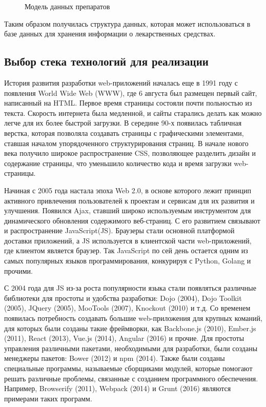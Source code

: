 \begin{figure}

\caption{Модель данных препаратов}
\label{src:src1}
\end{figure}

Таким образом получилась структура данных, которая может использоваться в базе данных для хранения информации о лекарственных средствах.

\subsection{Выбор стека технологий для реализации }

История развития разработки web-приложений началась еще в 1991 году с появления World Wide Web (WWW), где 6 августа был размещен первый сайт, написанный на HTML. Первое время страницы состояли почти польностью из текста. Скорость интернета была медленной, и сайты старались делать как можно легче для их более быстрой загрузки. В середине 90-х появилась табличная верстка, которая позволяла создавать страницы с графическими элементами, ставшая началом упорядоченного структурирования страниц. В начале нового века получило широкое распространение CSS, позволяющее разделить дизайн и содержание страницы, что уменьшило количество кода и время загрузки web-страницы.

Начиная с 2005 года настала эпоха Web 2.0, в основе которого лежит принцип активного привлечения пользователей к проектам и сервисам для их развития и улучшения. Появился Ajax, ставший широко используемым инструментом для динамического обновления содержимого веб-страниц. С его развитием связывают и распространение JavaScript(JS). Браузеры стали основной платформой доставки приложений, а JS используется в клиентской части web-приложений, где клиентом является браузер. Так JavaScript по сей день остается одним из самых популярных языков программирования, конкурируя с Python, Golang и прочими.

С 2004 года для JS из-за роста популярности языка стали появляться различные библиотеки для простоты и удобства разработки: Dojo (2004), Dojo Toolkit (2005), JQuery (2005), MooTools (2007), Knockout (2010) и т.д. Со временем появилась потребность создавать большие web-приложения для крупных команий, для которых были созданы такие фреймворки, как Backbone.js (2010), Ember.js (2011), React (2013), Vue.js (2014), Angular (2016) и прочие. Для простоты управления различными пакетами, необходимыми для разработки, были созданы менеджеры пакетов: Bower (2012) и npm (2014). Также были созданы специальные программы, называемые сборщиками модулей, которые помогают решать различные проблемы, связанные с созданием программного обеспечения. Например, Browserify (2011), Webpack (2014) и Grunt (2016) являются примерами таких программ.

